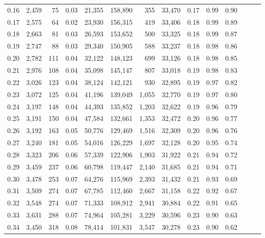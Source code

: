 \begin{tabular}{rrrrrrrrrrrrrr}
0.16 &  2,459 &   75 &  0.03 &   21,355 &  158,890 &     355 &  33,470 &  0.17 &  0.99 &      0.90 \\
0.17 &  2,575 &   64 &  0.02 &   23,930 &  156,315 &     419 &  33,406 &  0.18 &  0.99 &      0.89 \\
0.18 &  2,663 &   81 &  0.03 &   26,593 &  153,652 &     500 &  33,325 &  0.18 &  0.99 &      0.87 \\
0.19 &  2,747 &   88 &  0.03 &   29,340 &  150,905 &     588 &  33,237 &  0.18 &  0.98 &      0.86 \\
0.20 &  2,782 &  111 &  0.04 &   32,122 &  148,123 &     699 &  33,126 &  0.18 &  0.98 &      0.85 \\
0.21 &  2,976 &  108 &  0.04 &   35,098 &  145,147 &     807 &  33,018 &  0.19 &  0.98 &      0.83 \\
0.22 &  3,026 &  123 &  0.04 &   38,124 &  142,121 &     930 &  32,895 &  0.19 &  0.97 &      0.82 \\
0.23 &  3,072 &  125 &  0.04 &   41,196 &  139,049 &   1,055 &  32,770 &  0.19 &  0.97 &      0.80 \\
0.24 &  3,197 &  148 &  0.04 &   44,393 &  135,852 &   1,203 &  32,622 &  0.19 &  0.96 &      0.79 \\
0.25 &  3,191 &  150 &  0.04 &   47,584 &  132,661 &   1,353 &  32,472 &  0.20 &  0.96 &      0.77 \\
0.26 &  3,192 &  163 &  0.05 &   50,776 &  129,469 &   1,516 &  32,309 &  0.20 &  0.96 &      0.76 \\
0.27 &  3,240 &  181 &  0.05 &   54,016 &  126,229 &   1,697 &  32,128 &  0.20 &  0.95 &      0.74 \\
0.28 &  3,323 &  206 &  0.06 &   57,339 &  122,906 &   1,903 &  31,922 &  0.21 &  0.94 &      0.72 \\
0.29 &  3,459 &  237 &  0.06 &   60,798 &  119,447 &   2,140 &  31,685 &  0.21 &  0.94 &      0.71 \\
0.30 &  3,478 &  253 &  0.07 &   64,276 &  115,969 &   2,393 &  31,432 &  0.21 &  0.93 &      0.69 \\
0.31 &  3,509 &  274 &  0.07 &   67,785 &  112,460 &   2,667 &  31,158 &  0.22 &  0.92 &      0.67 \\
0.32 &  3,548 &  274 &  0.07 &   71,333 &  108,912 &   2,941 &  30,884 &  0.22 &  0.91 &      0.65 \\
0.33 &  3,631 &  288 &  0.07 &   74,964 &  105,281 &   3,229 &  30,596 &  0.23 &  0.90 &      0.63 \\
0.34 &  3,450 &  318 &  0.08 &   78,414 &  101,831 &   3,547 &  30,278 &  0.23 &  0.90 &      0.62 \\

\end{tabular}
